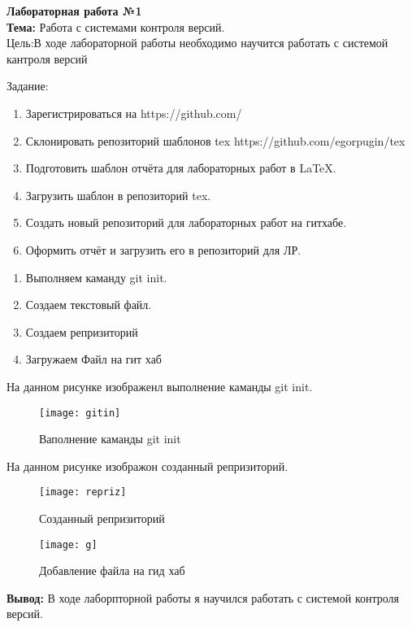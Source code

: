 
\begin{center}
\textbf{Лабораторная работа №1}
\\
\textbf{Тема:} Работа с системами контроля версий.
\\
Цель:В ходе лабораторной работы необходимо научится работать с системой кантроля версий 
\end{center}

Задание:
\begin{enumerate}

\item Зарегистрироваться на https://github.com/
\item Склонировать репозиторий шаблонов tex https://github.com/egorpugin/tex
\item Подготовить шаблон отчёта для лабораторных работ в LaTeX.
\item Загрузить шаблон в репозиторий tex.
\item Создать новый репозиторий для лабораторных работ на гитхабе.
\item Оформить отчёт и загрузить его в репозиторий для ЛР.
\end{enumerate}

\begin{enumerate}
\item Выполняем каманду git init.
\item Создаем текстовый файл.
\item Создаем репризиторий
\item Загружаем Файл на гит хаб
\end{enumerate}

На данном рисунке изображенл выполнение каманды git init.

\begin{figure}[]%
\centering
\texttt{[image: gitin]}
\caption{Ваполнение каманды git init}
\label{fig:gitin}
\end{figure}


На данном рисунке изображон созданный репризиторий.

\begin{figure}[]%
\centering
\texttt{[image: repriz]}
\caption{Созданный репризиторий}
\label{fig:repriz}
\end{figure}


\begin{figure}[]%
\centering
\texttt{[image: g]}
\caption{Добавление файла на гид хаб}
\label{fig:g}
\end{figure}

\newpage
\textbf{Вывод:}
В ходе лаборпторной работы я научился работать с системой контроля версий.




